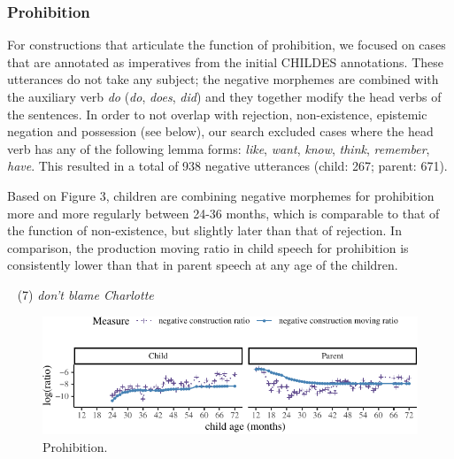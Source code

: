 \documentclass[10pt, letterpaper]{article}
\newenvironment{CodeChunk}{}{}
\begin{document}
\hypertarget{prohibition}{%
\subsubsection{Prohibition}\label{prohibition}}

For constructions that articulate the function of prohibition, we
focused on cases that are annotated as imperatives from the initial
CHILDES annotations. These utterances do not take any subject; the
negative morphemes are combined with the auxiliary verb \emph{do}
(\emph{do}, \emph{does}, \emph{did}) and they together modify the head
verbs of the sentences. In order to not overlap with rejection,
non-existence, epistemic negation and possession (see below), our search
excluded cases where the head verb has any of the following lemma forms:
\emph{like}, \emph{want}, \emph{know}, \emph{think}, \emph{remember},
\emph{have}. This resulted in a total of 938 negative utterances (child:
267; parent: 671).

Based on Figure 3, children are combining negative morphemes for
prohibition more and more regularly between 24-36 months, which is
comparable to that of the function of non-existence, but slightly later
than that of rejection. In comparison, the production moving ratio in
child speech for prohibition is consistently lower than that in parent
speech at any age of the children.

~ (7) \emph{don't blame Charlotte}

\begin{figure}[h]

\begin{CodeChunk}


\begin{center}\includegraphics{figs/prohibition-1} \end{center}

\end{CodeChunk}
\caption[This image spans both columns]{Prohibition.}\label{fig:prohibition}
\end{figure}
\end{document}
